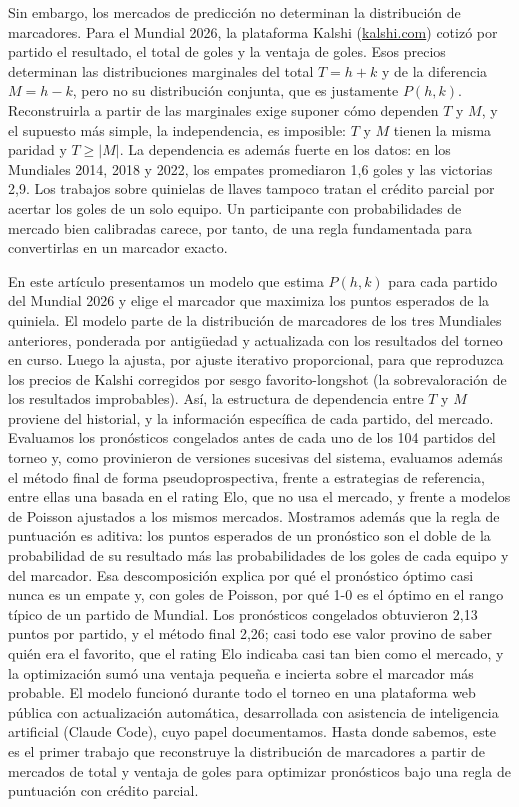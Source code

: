 \documentclass[12pt]{article}
\theoremstyle{plain}
\theoremstyle{remark}
\begin{document}
Sin embargo, los mercados de predicción no determinan la distribución
de marcadores.
Para el Mundial 2026, la plataforma Kalshi
(\href{https://kalshi.com}{kalshi.com}) cotizó por partido el
resultado, el total de goles y la ventaja de goles.
Esos precios determinan las distribuciones marginales del total
$T = h + k$ y de la diferencia $M = h - k$, pero no su distribución
conjunta, que es justamente $P(h,k)$.
Reconstruirla a partir de las marginales exige suponer cómo dependen
$T$ y $M$, y el supuesto más simple, la independencia, es imposible:
$T$ y $M$ tienen la misma paridad y $T \geq |M|$.
La dependencia es además fuerte en los datos: en los Mundiales 2014,
2018 y 2022, los empates promediaron 1,6 goles y las victorias 2,9.
Los trabajos sobre quinielas de llaves tampoco tratan el crédito
parcial por acertar los goles de un solo equipo.
Un participante con probabilidades de mercado bien calibradas carece,
por tanto, de una regla fundamentada para convertirlas en un marcador
exacto.

En este artículo presentamos un modelo que estima $P(h,k)$ para cada
partido del Mundial 2026 y elige el marcador que maximiza los puntos
esperados de la quiniela.
El modelo parte de la distribución de marcadores de los tres
Mundiales anteriores, ponderada por antigüedad y actualizada con los
resultados del torneo en curso.
Luego la ajusta, por ajuste iterativo proporcional, para que reproduzca
los precios de Kalshi corregidos por sesgo favorito-longshot (la
sobrevaloración de los resultados improbables).
Así, la estructura de dependencia entre $T$ y $M$ proviene del
historial, y la información específica de cada partido, del mercado.
Evaluamos los pronósticos congelados antes de cada uno de los 104
partidos del torneo y, como provinieron de versiones sucesivas del
sistema, evaluamos además el método final de forma pseudoprospectiva,
frente a estrategias de referencia, entre ellas una basada en el
rating Elo, que no usa el mercado, y frente a modelos de Poisson
ajustados a los mismos mercados.
Mostramos además que la regla de puntuación es aditiva: los puntos
esperados de un pronóstico son el doble de la probabilidad de su
resultado más las probabilidades de los goles de cada equipo y del
marcador.
Esa descomposición explica por qué el pronóstico óptimo casi nunca es
un empate y, con goles de Poisson, por qué 1-0 es el óptimo en el
rango típico de un partido de Mundial.
Los pronósticos congelados obtuvieron 2,13 puntos por partido, y el
método final 2,26; casi todo ese valor provino de saber quién era el
favorito, que el rating Elo indicaba casi tan bien como el mercado, y
la optimización sumó una ventaja pequeña e incierta sobre el marcador
más probable.
El modelo funcionó durante todo el torneo en una plataforma web
pública con actualización automática, desarrollada con asistencia de
inteligencia artificial (Claude Code), cuyo papel documentamos.
Hasta donde sabemos, este es el primer trabajo que reconstruye la
distribución de marcadores a partir de mercados de total y ventaja de
goles para optimizar pronósticos bajo una regla de puntuación con
crédito parcial.
\end{document}
